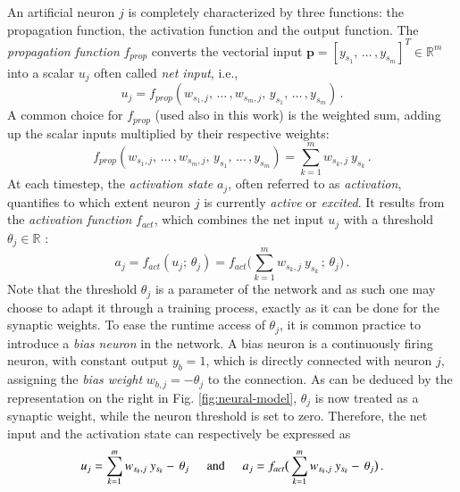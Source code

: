 \documentclass[longtitle]{elsarticle}
\numberwithin{equation}{section}
\theoremstyle{theorem}
\theoremstyle{definition}
\theoremstyle{remark}
\theoremstyle{proposition}
\numberwithin{figure}{section}
\begin{document}
		An artificial neuron $j$ is completely characterized by three functions: the propagation function, the activation function and the output function. The \emph{propagation function} $f_{prop}$ converts the vectorial input $\mathbf{p} = [y_{s_1}, \, \ldots \, , y_{s_m}]^T \in \mathbb{R}^m$ into a scalar $u_{j}$ often called \emph{net input}, i.e.,
		\begin{equation*}
			\label{eq:propagation-function}
			u_{j} = f_{prop}(w_{s_1,j}, \, \ldots \, , w_{s_m,j}, \, y_{s_1}, \, \ldots \, , y_{s_m}) \, .
		\end{equation*}
		A common choice for $f_{prop}$ (used also in this work) is the weighted sum, adding up the scalar inputs multiplied by their respective weights:
		\begin{equation*}
			\label{eq:weighted-sum}
			f_{prop}(w_{s_1,j}, \, \ldots \, , w_{s_m,j}, \, y_{s_1}, \, \ldots \, , y_{s_m}) = \sum_{k = 1}^m w_{s_k,j} ~ y_{s_k} \, .
		\end{equation*} 
		At each timestep, the \emph{activation state} $a_j$, often referred to as \emph{activation}, quantifies to which extent neuron $j$ is currently \emph{active} or \emph{excited}. It results from the \emph{activation function} $f_{act}$, which combines the net input $u_j$ with a threshold $\theta_j \in \mathbb{R}$ \cite{Kri07}: 
		\begin{equation*}
			\label{eq:activation-function}
			a_j = f_{act}(u_j; \, \theta_j) = f_{act} \big( \sum_{k = 1}^m w_{s_k,j} ~ y_{s_k} \, ; \, \theta_j \big) \, .
		\end{equation*}
		Note that the threshold $\theta_j$ is a parameter of the network and as such one may choose to adapt it through a training process, exactly as it can be done for the synaptic weights. To ease the runtime access of $\theta_j$, it is common practice to introduce a \emph{bias neuron} in the network. A bias neuron is a continuously firing neuron, with constant output $y_{b} = 1$, which is directly connected with neuron $j$, assigning the \emph{bias weight} $w_{b,j} = - \theta_j$ to the connection. As can be deduced by the representation on the right in Fig. \ref{fig:neural-model}, $\theta_j$ is now treated as a synaptic weight, while the neuron threshold is set to zero. Therefore, the net input and the activation state can respectively be expressed as
		\begin{equation*}
			u_j = \sum_{k = 1}^m w_{s_k,j} ~ y_{s_k} - \, \theta_j \hspace*{0.5cm} \text{and} \hspace*{0.5cm} a_j = f_{act} \big( \sum_{k = 1}^m w_{s_k,j} ~ y_{s_k} - \, \theta_j \big) \, .
		\end{equation*}		
\end{document}

